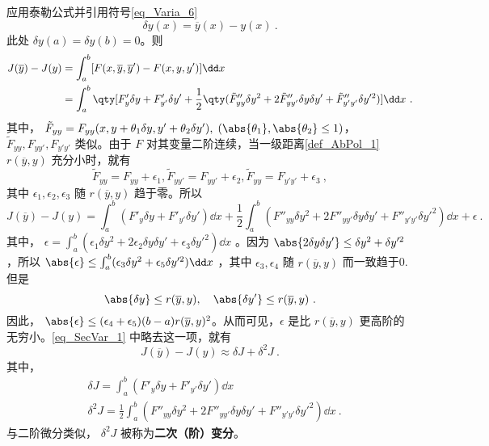 应用泰勒公式并引用符号\autoref{eq_Varia_6}~
\begin{equation}
\delta y(x)=\overline{y}(x)-y(x)~.
\end{equation}
此处 $\delta y(a)=\delta y(b)=0$。则
\begin{equation}
\begin{aligned}
J(\overline{y})-J(y)&=\int_a^b[F(x,\overline{y},\overline{y}')-F(x,y,y')]\dd x\\
&=\int_a^b\qty[F'_y\delta y+F'_{y'}\delta y'+\frac{1}{2}\qty(\tilde{F}''_{yy}\delta y^2+2\tilde{F}''_{yy'}\delta y\delta y'+\tilde{F}''_{y'y'}\delta y'^2)]\dd x~.
\end{aligned}
\end{equation}
其中， $\tilde{F}_{yy}=F_{yy}(x,y+\theta_1\delta y,y'+\theta_2\delta y'),\;(\abs{\theta_1},\abs{\theta_2}\leq1)$，$\tilde{F}_{yy},F_{yy'},F_{y'y'}$ 类似。由于 $F$ 对其变量二阶连续，当一级距离\autoref{def_AbPol_1}~ $r(\overline{y},y)$ 充分小时，就有
\begin{equation}
\tilde F_{yy}=F_{yy}+\epsilon_1,\tilde F_{yy'}=F_{yy'}+\epsilon_2,\tilde F_{yy}=F_{y'y'}+\epsilon_3~,
\end{equation}
其中 $\epsilon_1,\epsilon_2,\epsilon_3$ 随 $r(\overline{y},y)$ 趋于零。所以
\begin{equation}\label{eq_SecVar_1}
J(\overline{y})-J(y)=\int_a^b(F'_y\delta y+F'_{y'}\delta y')\dd x+\frac{1}{2}\int_a^b(F''_{yy}\delta y^2+2F''_{yy'}\delta y\delta y'+F''_{y'y'}\delta y'^2)\dd x+\epsilon~.
\end{equation}
其中， $\epsilon=\int_a^b(\epsilon_1\delta y^2+2\epsilon_2\delta y\delta y'+\epsilon_3\delta y'^2)\dd x$
。因为 $\abs{2\delta y\delta y'}\leq \delta y^2+\delta y'^2$，所以 $\abs{\epsilon}\leq \int_a^b(\epsilon_3\delta y^2+\epsilon_5\delta y'^2)\dd x$ ，其中 $\epsilon_3,\epsilon_4$ 随 $r(\overline{y},y)$ 而一致趋于0.但是
\begin{equation}
\abs{\delta y}\leq r(\overline{y},y),\quad \abs{\delta y'}\leq r(\overline{y},y)~.
\end{equation}
因此， $\abs{\epsilon}\leq (\epsilon_4+\epsilon_5)(b-a)r(\overline{y},y)^2$。从而可见，$\epsilon$ 是比 $r(\overline{y},y)$ 更高阶的无穷小。\autoref{eq_SecVar_1} 中略去这一项，就有
\begin{equation}
J(\overline{y})-J(y)\approx\delta J+\delta^2J~.
\end{equation}
其中，
\begin{equation}
\begin{aligned}
&\delta J=\int_a^b(F'_y\delta y+F'_{y'}\delta y')\dd x\\
&\delta^2 J=\frac{1}{2}\int_a^b(F''_{yy}\delta y^2+2F''_{yy'}\delta y\delta y'+F''_{y'y'}\delta y'^2)\dd x~.
\end{aligned}
\end{equation}
与二阶微分类似， $\delta^2J$ 被称为\textbf{二次（阶）变分}。